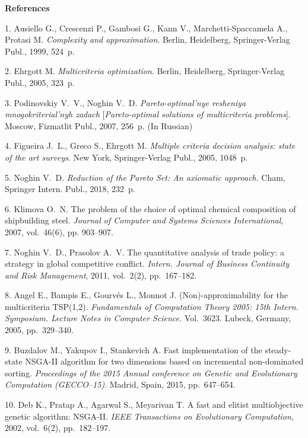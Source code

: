 
{\small

\vskip4mm%

\noindent \textbf{References} }

\vskip 1.5mm%

{\footnotesize

1. Ausiello G., Crescenzi P., Gambosi G., Kann V.,
Marchetti-Spaccamela A., Protasi M. \textit{Complexity and
approximation}. Berlin, Heidelberg, Springer-Verlag Publ., 1999,
524~p.

2. Ehrgott M. \textit{Multicriteria optimization}. Berlin,
Heidelberg, Springer-Verlag Publ., 2005, 323~p. 

3. Podinovskiy V.~V., Noghin V.~D. \textit{Pareto-optimal'nye
resheniya
  mnogokriterial'nyh zadach} [\textit{Pareto-optimal solutions of multicriteria
  problems}]. Moscow, Fizmatlit Publ., 2007, 256~p. (In Russian)

4. Figueira J.~L., Greco S., Ehrgott M. \textit{Multiple criteria
decision analysis:
  state of the art surveys}. New York, Springer-Verlag Publ., 2005, 1048~p.

5. Noghin V.~D. \textit{Reduction of the Pareto Set: An axiomatic
approach}.
  Cham, Springer Intern. Publ., 2018, 232~p.

6. Klimova O.~N. The problem of the choice of optimal chemical
composition of
  shipbuilding steel. \textit{Journal of Computer and Systems Sciences International},
  2007, vol.~46(6), pp. 903--907.

7. Noghin V.~D., Prasolov A.~V. The quantitative analysis of trade
policy: a
  strategy in global competitive conflict.
  \textit{Intern. Journal of Business Continuity and Risk
  Management}, 2011, vol.~2(2), pp.~167--182.

8. Angel E., Bampis E., Gourv\'es L., Monnot J.
(Non)-approximability for
  the multicriteria TSP(1,2). \textit{Fundamentals of Computation Theory 2005: 15th Intern. Symposium.
  Lecture Notes in Computer Science.} Vol.~3623. Lubeck, Germany, 2005, pp.~329--340.

9. Buzdalov M., Yakupov I., Stankevich A. Fast implementation of
the
  steady-state NSGA-II algorithm for two dimensions based on incremental
  non-dominated sorting. \textit{Proceedings of the 2015 Annual conference on
  Genetic and Evolutionary Computation (GECCO--15)}. Madrid, Spain, 2015, pp.~647--654.

10. Deb K., Pratap A., Agarwal S., Meyarivan T. A fast and elitist
  multiobjective genetic algorithm: NSGA-II. \textit{IEEE Transactions on
  Evolutionary Computation}, 2002, vol.~6(2), pp.~182--197.

}

